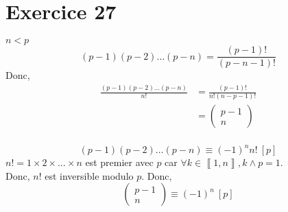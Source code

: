\part{Exercice 27}
$n < p$
 \[
	 (p-1)(p-2)\ldots(p-n) = \frac{(p-1)!}{(p-n-1)!}
\] 
Donc,
\begin{align*}
	\frac{(p-1)(p-2)\ldots(p-n)}{n!} &= \frac{(p-1)!}{n!(n-p-1)!}\\
	&= \begin{pmatrix} p-1\\n \end{pmatrix}\\
\end{align*}

\[
	(p-1)(p-2)\ldots(p-n)\equiv(-1)^n n! ~[p]
\] 
$n! = 1 \times  2 \times \ldots \times n$ est premier avec $p$ car $\forall k \in \left\llbracket 1,n \right\rrbracket, k \wedge p = 1$.\\
Donc, $n!$ est inversible modulo $p$. Donc, \[
	\begin{pmatrix} p-1\\n \end{pmatrix} \equiv (-1)^n ~[p]
\]
